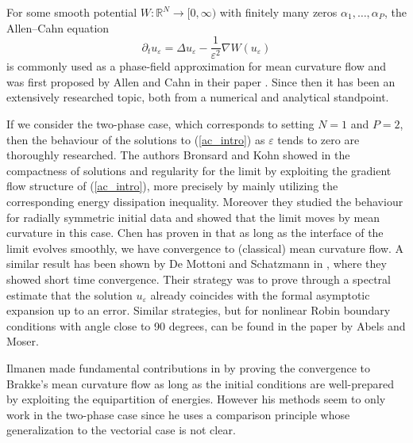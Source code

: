 For some smooth potential $ W 
\colon \mathbb{ R }^{ N } \to [ 0 , \infty ) $ with 
finitely many zeros $ \alpha_{ 1 } , \dotsc, \alpha_{ P } $, the Allen--Cahn 
equation
\begin{equation}
	\label{ac_intro}
	\partial_{ t } u_{ \varepsilon }
	=
	\Delta u_{ \varepsilon }
	-
	\frac{ 1 }{ \varepsilon^{ 2 } }
	\nabla W ( u_{ \varepsilon } )
\end{equation}
is commonly used as a phase-field approximation for mean curvature flow and was 
first proposed by Allen and Cahn in their paper 
\cite{allen_cahn_microscopig_theory_for_antiphase_boundary_motion}.
Since then it has been an extensively researched topic, both from a numerical 
and 
analytical standpoint. 

If we consider the two-phase case, which corresponds to setting $ N = 1 $ and $ 
P = 2 $, then 
the behaviour of the solutions to (\ref{ac_intro}) as $ \varepsilon $ tends to 
zero are thoroughly researched.
The authors Bronsard and Kohn showed in 
\cite{bronsard_kohn_motion_by_mean_curvature_as_singular_limit} the compactness 
of solutions and regularity for the limit by exploiting the gradient flow 
structure of (\ref{ac_intro}), more precisely by mainly utilizing the 
corresponding energy dissipation inequality. Moreover they studied the 
behaviour 
for radially symmetric initial data and showed that the limit moves by mean 
curvature in this 
case. 
Chen has proven in 
\cite{chen_generation_and_propagation_of_interfaces_for_reaction_diffusion_equations}
that as long as the interface of the limit evolves smoothly, we have 
convergence to (classical) mean curvature flow. 
A similar result has been shown 
by De Mottoni and Schatzmann in 
\cite{de_mottoni_schatzmann_geometrical_evolution_of_developed_interfaces}, 
where they showed short time convergence. Their strategy was to prove through a 
spectral estimate that the solution $ u_{ 
\varepsilon } $ already coincides with the formal asymptotic expansion up to an 
error. Similar strategies, but for nonlinear Robin 
boundary conditions with angle close to 90 degrees, can be found in the paper
\cite{abels_moser_convergence_of_ac_with_nonlinear_robin_boundary_condition_to_mcf}
by Abels and Moser.

Ilmanen made fundamental contributions in 
\cite{ilmanen_convergence_of_ac_to_brakkes_mcf} by proving the convergence to 
Brakke's mean curvature flow as long as the initial conditions are 
well-prepared by exploiting the equipartition of energies. However his methods 
seem to only work in the two-phase case since he uses a comparison principle 
whose generalization to the vectorial case is not clear.

